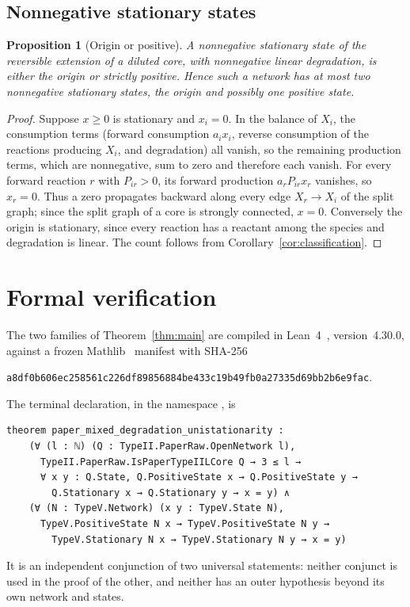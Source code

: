 \documentclass[11pt,a4paper]{article}
\theoremstyle{plain}
\newtheorem{proposition}[theorem]{Proposition}
\theoremstyle{definition}
\theoremstyle{remark}
\numberwithin{equation}{section}
\begin{document}
\subsection{Nonnegative stationary states}

\begin{proposition}[Origin or positive]\label{prop:boundarystates}
A nonnegative stationary state of the reversible extension of a diluted core, with nonnegative linear degradation, is either the origin or strictly positive. Hence such a network has at most two nonnegative stationary states, the origin and possibly one positive state.
\end{proposition}

\begin{proof}
Suppose $x\ge0$ is stationary and $x_i=0$. In the balance of $X_i$, the consumption terms (forward consumption $a_ix_i$, reverse consumption of the reactions producing $X_i$, and degradation) all vanish, so the remaining production terms, which are nonnegative, sum to zero and therefore each vanish. For every forward reaction $r$ with $P_{ir}>0$, its forward production $a_rP_{ir}x_r$ vanishes, so $x_r=0$. Thus a zero propagates backward along every edge $X_r\to X_i$ of the split graph; since the split graph of a core is strongly connected, $x=0$. Conversely the origin is stationary, since every reaction has a reactant among the species and degradation is linear. The count follows from Corollary~\ref{cor:classification}.
\end{proof}

\section{Formal verification}\label{sec:formal}

The two families of Theorem~\ref{thm:main} are compiled in Lean~4~\cite{dMU21}, version~4.30.0, against a frozen Mathlib~\cite{mathlib20} manifest with SHA-256
\begin{center}\small\texttt{a8df0b606ec258561c226df89856884be433c19b49fb0a27335d69bb2b6e9fac}.\end{center}
The terminal declaration, in the namespace , is
\begin{lstlisting}
theorem paper_mixed_degradation_unistationarity :
    (∀ (l : ℕ) (Q : TypeII.PaperRaw.OpenNetwork l),
      TypeII.PaperRaw.IsPaperTypeIILCore Q → 3 ≤ l →
      ∀ x y : Q.State, Q.PositiveState x → Q.PositiveState y →
        Q.Stationary x → Q.Stationary y → x = y) ∧
    (∀ (N : TypeV.Network) (x y : TypeV.State N),
      TypeV.PositiveState N x → TypeV.PositiveState N y →
        TypeV.Stationary N x → TypeV.Stationary N y → x = y)
\end{lstlisting}
It is an independent conjunction of two universal statements: neither conjunct is used in the proof of the other, and neither has an outer hypothesis beyond its own network and states.
\end{document}
